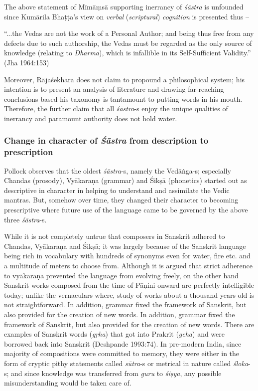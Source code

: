 The above statement of Mīmāṃsā supporting inerrancy of {\sl śāstra} is unfounded since Kumārila Bhaṭṭa's view on {\sl verbal} ({\sl scriptural}) {\sl cognition} is presented thus --
\begin{myquote}
“...the Vedas are not the work of a Personal Author; and being thus free from any defects due to such authorship, the Vedas must be regarded as the only source of knowledge (relating to {\sl Dharma}), which is infallible in its Self-Suﬃcient Validity.'' (Jha 1964:153)
\end{myquote}

Moreover, Rājaśekhara does not claim to propound a philosophical system; his intention is to present an analysis of literature and drawing far-reaching conclusions based his taxonomy is tantamount to putting words in his mouth. Therefore, the further claim that all {\sl śāstra}-s enjoy the unique qualities of inerrancy and paramount authority does not hold water.

\subsubsection{Change in character of {{\sl\bfseries Śāstra}\relax} from description to prescription}\label{art12-sec3.4.1}

Pollock observes that the oldest {\sl śāstra}-s, namely the Vedāṅga-s; especially Chandas (prosody), Vyākaraṇa (grammar) and Śikṣā (phonetics) started out as descriptive in character in helping to understand and assimilate the Vedic mantras. But, somehow over time, they changed their character to becoming prescriptive where future use of the language came to be governed by the above three {\sl śāstra}-s.

While it is not completely untrue that composers in Sanskrit adhered to Chandas, Vyākaraṇa and Śikṣā; it was largely because of the Sanskrit language being rich in vocabulary with hundreds of synonyms even for water, ﬁre etc. and a multitude of meters to choose from. Although it is argued that strict adherence to vyākaraṇa prevented the language from evolving freely, on the other hand Sanskrit works composed from the time of Pāṇini onward are perfectly intelligible today; unlike the vernaculars where, study of works about a thousand years old is not straightforward. In addition, grammar ﬁxed the framework of Sanskrit, but also provided for the creation of new words. In addition, grammar fixed the framework of Sanskrit, but also provided for the creation of new words. There are examples of Sanskrit words ({\sl gṛha}) that got into Prakrit ({\sl geha}) and were borrowed back into Sanskrit (Deshpande 1993:74). In pre-modern India, since majority of compositions were committed to memory, they were either in the form of cryptic pithy statements called {\sl sūtra}-s or metrical in nature called {\sl śloka}-s; and since knowledge was transferred from {\sl guru} to {\sl śiṣya}, any possible misunderstanding would be taken care of.

